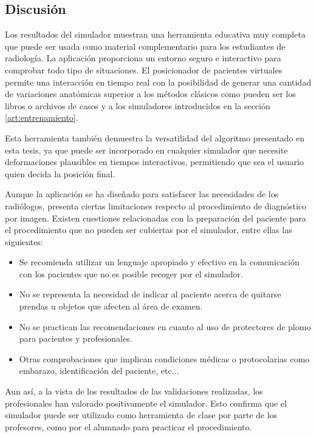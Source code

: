 \clearpage
\subsection{Discusión}
\label{xray:discusion}
Los resultados del simulador muestran una herramienta educativa muy completa que puede ser usada como material complementario para los estudiantes de radiología. La aplicación proporciona un entorno seguro e interactivo para comprobar todo tipo de situaciones. El posicionador de pacientes virtuales permite una interacción en tiempo real con la posibilidad de generar una cantidad de variaciones anatómicas superior a los métodos clásicos como pueden ser los libros o archivos de casos y a los simuladores introducidos en la sección \ref{art:entrenamiento}.

Esta herramienta también demuestra la versatilidad del algoritmo presentado en esta tesis, ya que puede ser incorporado en cualquier simulador que necesite deformaciones plausibles en tiempos interactivos, permitiendo que sea el usuario quien decida la posición final.

Aunque la aplicación se ha diseñado para satisfacer las necesidades de los radiólogos, presenta ciertas limitaciones respecto al procedimiento de diagnóstico por imagen. Existen cuestiones relacionadas con la preparación del paciente para el procedimiento que no pueden ser cubiertas por el simulador, entre ellas las siguientes:

\begin{itemize}
    \item Se recomienda utilizar un lenguaje apropiado y efectivo en la comunicación con los pacientes que no es posible recoger por el simulador.
    \item No se representa la necesidad de indicar al paciente acerca de quitarse prendas u objetos que afecten al área de examen.
    \item No se practican las recomendaciones en cuanto al uso de protectores de plomo para pacientes y profesionales.
    \item Otras comprobaciones que implican condiciones médicas o protocolarias como embarazo, identificación del paciente, etc...
\end{itemize}

Aun así, a la vista de los resultados de las validaciones realizadas, los profesionales han valorado positivamente el simulador. Esto confirma que el simulador puede ser utilizado como herramienta de clase por parte de los profesores, como por el alumnado para practicar el procedimiento. 
